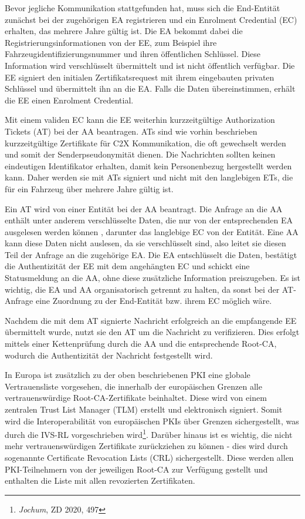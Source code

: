 Bevor jegliche Kommunikation stattgefunden hat, muss sich die End-Entität zunächst bei der zugehörigen EA registrieren und ein Enrolment Credential (EC) erhalten, das mehrere Jahre gültig ist. Die EA bekommt dabei die Registrierungsinformationen von der EE, zum Beispiel ihre Fahrzeugidentifizierungsnummer und ihren öffentlichen Schlüssel. Diese Information wird verschlüsselt übermittelt und ist nicht öffentlich verfügbar. Die EE signiert den initialen Zertifikatsrequest mit ihrem eingebauten privaten Schlüssel und übermittelt ihn an die EA. Falls die Daten übereinstimmen, erhält die EE einen Enrolment Credential.

Mit einem validen EC kann die EE weiterhin kurzzeitgültige Authorization Tickets (AT) bei der AA beantragen. ATs sind wie vorhin beschrieben kurzzeitgültige Zertifikate für C2X Kommunikation, die oft gewechselt werden und somit der Senderpseudonymität dienen. Die Nachrichten sollten keinen eindeutigen Identifikator erhalten, damit kein Personenbezug hergestellt werden kann. Daher werden sie mit ATs signiert und nicht mit den langlebigen ETs, die für ein Fahrzeug über mehrere Jahre gültig ist. 

Ein AT wird von einer Entität bei der AA beantragt. Die Anfrage an die AA enthält unter anderem verschlüsselte Daten, die nur von der entsprechenden EA ausgelesen werden können \cite{ETSI2018}, darunter das langlebige EC von der Entität. Eine AA kann diese Daten nicht auslesen, da sie verschlüsselt sind, also leitet sie diesen Teil der Anfrage an die zugehörige EA. Die EA entschlüsselt die Daten, bestätigt die Authentizität der EE mit dem angehängten EC und schickt eine Statusmeldung an die AA, ohne diese zusätzliche Information preiszugeben. Es ist wichtig, die EA und AA organisatorisch getrennt zu halten, da sonst bei der AT-Anfrage eine Zuordnung zu der End-Entität bzw. ihrem EC möglich wäre.

Nachdem die mit dem AT signierte Nachricht erfolgreich an die empfangende EE übermittelt wurde, nutzt sie den AT um die Nachricht zu verifizieren. Dies erfolgt mittels einer Kettenprüfung durch die AA und die  entsprechende Root-CA, wodurch die Authentizität der Nachricht festgestellt wird.

In Europa ist zusätzlich zu der oben beschriebenen PKI eine globale Vertrauensliste vorgesehen, die innerhalb der europäischen Grenzen alle vertrauenswürdige Root-CA-Zertifikate beinhaltet. Diese wird von einem zentralen Trust List Manager (TLM) erstellt und elektronisch signiert. Somit wird die Interoperabilität von europäischen PKIs über Grenzen sichergestellt, was durch die IVS-RL vorgeschrieben wird\footnote{\emph{Jochum}, ZD 2020, 497}. Darüber hinaus ist es wichtig, die nicht mehr vertrauenswürdigen Zertifikate zurückziehen zu können - dies wird durch sogenannte Certificate Revocation Lists (CRL) sichergestellt. Diese werden allen PKI-Teilnehmern von der jeweiligen Root-CA zur Verfügung gestellt und enthalten die Liste mit allen revozierten Zertifikaten.  

